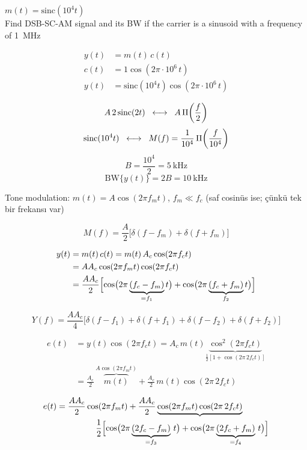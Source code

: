 \documentclass[11pt,a4paper]{article}
\begin{document}
\begin{ornek}
$m(t) = \mathrm{sinc}(10^4 t)$ \\
Find DSB-SC-AM signal and its BW if the carrier is a sinusoid with a frequency of \qty{1}{\mega\hertz}
\end{ornek}

\begin{align*}
y(t) &= m(t)\,c(t)\\
c(t) &= 1\cos(2\pi\cdot 10^6\, t)\\
y(t) &= \mathrm{sinc}(10^4 t)\cos(2\pi\cdot 10^6\, t)
\end{align*}

\[ A\,2\,\mathrm{sinc}(2t) \;\;\longleftrightarrow\;\; A\,\Pi\!\left(\frac f2\right) \]
\[ \mathrm{sinc}(10^4 t) \;\;\longleftrightarrow\;\; M(f) = \frac{1}{10^4}\,\Pi\!\left(\frac{f}{10^4}\right) \]
\[ B = \frac{10^4}{2} = 5\ \mathrm{kHz} \]
\[ \mathrm{BW}\{y(t)\} = 2B = 10\ \mathrm{kHz} \]

\begin{ornek}
Tone modulation: $m(t) = A\cos(2\pi f_m t)$, $f_m \ll f_c$ \quad (saf cosinüs ise; çünkü tek bir frekansı var)
\end{ornek}

\[ M(f) = \frac A2\bigl[\delta(f-f_m)+\delta(f+f_m)\bigr] \]

\begin{align*}
y(t) &= m(t)\,c(t) = m(t)\,A_c\cos(2\pi f_c t)\\
&= A A_c\cos(2\pi f_m t)\cos(2\pi f_c t)\\
&= \frac{A A_c}{2}\Bigl[\cos\bigl(2\pi\underbrace{(f_c-f_m)}_{=f_1}t\bigr)+\cos\bigl(2\pi\underbrace{(f_c+f_m)}_{f_2}t\bigr)\Bigr]
\end{align*}

\[ Y(f) = \frac{A A_c}{4}\bigl[\delta(f-f_1)+\delta(f+f_1)+\delta(f-f_2)+\delta(f+f_2)\bigr] \]

\begin{align*}
e(t) &= y(t)\cos(2\pi f_c t) = A_c\, m(t)\underbrace{\cos^2(2\pi f_c t)}_{\frac12[1+\cos(2\pi\, 2f_c t)]}\\
&= \frac{A_c}{2}\,\overbrace{m(t)}^{A\cos(2\pi f_m t)} + \frac{A_c}{2}\, m(t)\cos(2\pi\, 2f_c t)
\end{align*}

\begin{align*}
e(t) &= \frac{A A_c}{2}\cos(2\pi f_m t) + \frac{A A_c}{2}\underbrace{\cos(2\pi f_m t)\cos(2\pi\, 2f_c t)}\\
&\qquad\qquad\ \ \frac12\Bigl[\cos\bigl(2\pi\underbrace{(2f_c-f_m)}_{=f_3}\,t\bigr)+\cos\bigl(2\pi\underbrace{(2f_c+f_m)}_{=f_4}\,t\bigr)\Bigr]
\end{align*}
\end{document}
